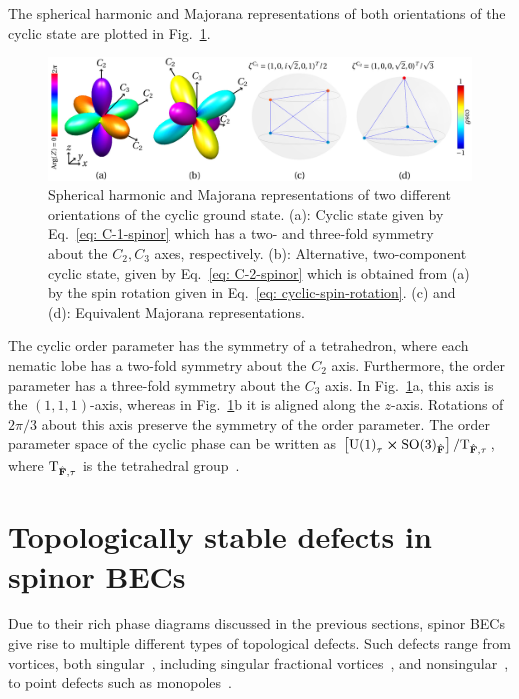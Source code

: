 The spherical harmonic and Majorana representations of both orientations of the
cyclic state are plotted in Fig.~\ref{fig: cyclic-graph}.
\begin{figure}
    \centering
    \includegraphics[width=\textwidth]
    {gfx/ch-groundStateSymmetries/spin-2-cyclic.pdf}
    \caption[Spherical harmonic and Majorana representations of two different
    orientations of the cyclic ground state.]
    {\label{fig: cyclic-graph}Spherical harmonic and Majorana representations of
    two different orientations of the cyclic ground state.
    (a): Cyclic state given by Eq.~\eqref{eq: C-1-spinor} which has a two- and
    three-fold symmetry about the \(C_2, C_3\) axes, respectively.
    (b): Alternative, two-component cyclic state, given by
    Eq.~\eqref{eq: C-2-spinor} which is obtained from (a) by the spin rotation
    given in Eq.~\eqref{eq: cyclic-spin-rotation}.
    (c) and (d): Equivalent Majorana representations.}
\end{figure}
The cyclic order parameter has the symmetry of a tetrahedron, where each nematic
lobe has a two-fold symmetry about the \(C_2\) axis.
Furthermore, the order parameter has a three-fold symmetry about the \(C_3\)
axis.
In Fig.~\ref{fig: cyclic-graph}a, this axis is the \((1, 1, 1)\)-axis, whereas
in Fig.~\ref{fig: cyclic-graph}b it is aligned along the \(z\)-axis.
Rotations of \(2\pi/3\) about this axis preserve the symmetry of the order
parameter.
The order parameter space of the cyclic phase can be written as
\(\left[{\text{U}(1)}_\tau \cross {\text{SO}(3)}_{\hat{\vb{F}}}\right]
/ \text{T}_{\hat{\vb{F}}, \tau}\), where \(\text{T}_{\hat{\vb{F}}, \tau}\) is
the tetrahedral group~\cite{Kobayashi2012}.

\section{Topologically stable defects in spinor BECs}
Due to their rich phase diagrams discussed in the previous sections, spinor BECs
give rise to multiple different types of topological defects.
Such defects range from vortices, both singular~\cite{Yip1999,Isoshima2002,
Mizushima2002, Sadler2006,Semenoff2007,Lovegrove2012,Lovegrove2016,
Borgh2016,Weiss2019,Xiao2021,Xiao2022}, including singular
fractional vortices~\cite{Leonhardt2000, Zhou2003,Ji2008,Seo2015,Semenoff2007,
Kobayashi2009,Lovegrove2012, Lovegrove2016,Borgh2016,Borgh2017,Xiao2021,
Xiao2022}, and nonsingular~\cite{Ohmi1998, Ho1998, Mizushima2002a,
Martikainen2002, Leanhardt2003, Mizushima2004, Choi2012, Choi2012a,
Lovegrove2014,Weiss2019}, to point defects such as monopoles~\cite{Stoof2001,
Savage2003,Ruostekoski2003, Pietila2009,Ray2014,Ray2015,Ollikainen2017,
Mithun2022}.

